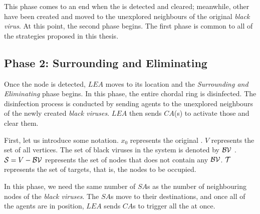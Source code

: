 This phase comes to an end when the \bv is detected and cleared; meanwhile, other \bvs have been created and moved to the unexplored neighbours of the original {\it black virus}. At this point, the second phase begins. The first phase is common to all of the strategies proposed in this thesis.



\subsection{Phase 2: Surrounding and Eliminating}
 
Once the \bv node is detected, $LEA$ moves to its location and the {\em Surrounding and Eliminating} phase begins. In this phase, the entire chordal ring is disinfected. The disinfection process is conducted by sending agents to the unexplored neighbours of the newly created {\it black viruses}. $LEA$ then sends $CA$(s) to activate those \bvs and  clear them. 

 First, let us introduce some notation. $x_0$ represents the original \bv. $V$ represents  the set of all vertices. The set of black viruses in the system is denoted by  ${\cal BV}$ .
${\cal S} = V - {\cal BV}$ represents the set of  nodes that does not contain any ${\cal BV}$. ${\cal T}$ represents the set of targets, that is, the nodes to be occupied. 

  \begin{center}
\end{center}



 In this phase, we need the same number of $SA$s as the number of neighbouring nodes of the {\it black viruses}. The $SA$s move to their destinations, and once all of the agents are in position, $LEA$ sends $CA$s to trigger all the \bvs at once. 


